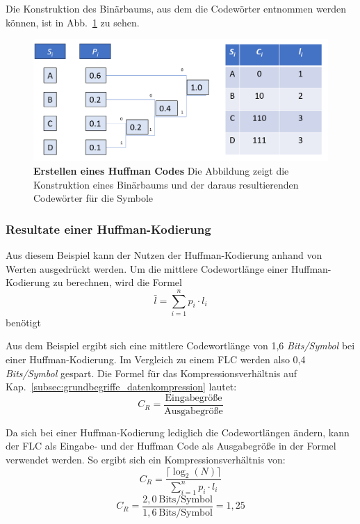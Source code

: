 Die Konstruktion des Binärbaums, aus dem die Codewörter entnommen werden können, ist in Abb.~\ref{fig:huffman_example} zu sehen.

\begin{figure}[htb]
  \centering  
  \includegraphics[scale=0.4]{Bilder/Huffmancode_beispiel.png}
  \caption[Huffman Code Beispiel]{\textbf{Erstellen eines Huffman Codes} Die Abbildung zeigt die Konstruktion eines Binärbaums und der daraus resultierenden Codewörter für die Symbole}
  \label{fig:huffman_example}
\end{figure}

\subsubsection{Resultate einer Huffman-Kodierung}
\label{subsec:huffman_res}
Aus diesem Beispiel kann der Nutzen der Huffman-Kodierung anhand von Werten ausgedrückt werden. \newline
Um die mittlere Codewortlänge einer Huffman-Kodierung zu berechnen, wird die Formel
\begin{equation*}
\bar{l} = \sum_{i=1}^{n} p_i \cdot l_i
\end{equation*}
benötigt \newline

Aus dem Beispiel ergibt sich eine mittlere Codewortlänge von 1,6 \textit{Bits/Symbol} bei einer Huffman-Kodierung.
Im Vergleich zu einem FLC werden also 0,4 \textit{Bits/Symbol} gespart. 
Die Formel für das Kompressionsverhältnis auf Kap.~\ref{subsec:grundbegriffe_datenkompression} lautet:
\begin{equation*}
C_R = \frac{\text{Eingabegröße}}{\text{Ausgabegröße}}
\end{equation*}

Da sich bei einer Huffman-Kodierung lediglich die Codewortlängen ändern, kann der FLC als Eingabe- und der Huffman Code als Ausgabegröße in der Formel verwendet werden.
So ergibt sich ein Kompressionsverhältnis von:
\begin{equation*}
C_R = \frac{\lceil \log_2(N) \rceil}{\sum_{i=1}^{n} p_i \cdot l_i}
\end{equation*}
\begin{equation*}
C_R = \frac{2,0 \ \text{Bits/Symbol}}{1,6 \ \text{Bits/Symbol}} = 1,25
\end{equation*}

